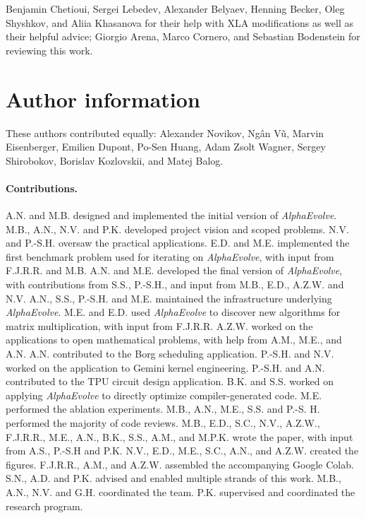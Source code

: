 \documentclass[logo,copyright,12pt]{googledeepmind}
\theoremstyle{definition}
\theoremstyle{remark}
\theoremstyle{plain}
\newcommand{\method}{\emph{AlphaEvolve}\xspace}
\begin{document}
Benjamin Chetioui, Sergei Lebedev, Alexander Belyaev, Henning Becker, Oleg Shyshkov, and Aliia Khasanova for their help with XLA modifications as well as their helpful advice; Giorgio Arena, Marco Cornero, and Sebastian Bodenstein for reviewing this work.


\section*{Author information}
\label{sec:authors}

These authors contributed equally: Alexander Novikov, Ngân Vũ, Marvin Eisenberger, Emilien Dupont, Po-Sen Huang, Adam Zsolt Wagner, Sergey Shirobokov, Borislav Kozlovskii, and Matej Balog.

\paragraph{Contributions.}
A.N. and M.B. designed and implemented the initial version of \method.
\;
M.B., A.N., N.V. and P.K. developed project vision and scoped problems.
\;
N.V. and P.-S.H. oversaw the practical applications.
\;
E.D. and M.E. implemented the first benchmark problem used for iterating on \method, with input from F.J.R.R. and M.B.
\;
A.N. and M.E. developed the final version of \method, with contributions from S.S., P.-S.H., and input from M.B., E.D., A.Z.W. and N.V.
\;
A.N., S.S., P.-S.H. and M.E. maintained the infrastructure underlying \method.
\;
M.E. and E.D. used \method to discover new algorithms for matrix multiplication, with input from F.J.R.R.
\;
A.Z.W. worked on the applications to open mathematical problems, with help from A.M., M.E., and A.N.
\;
A.N. contributed to the Borg scheduling application.
\;
P.-S.H. and N.V. worked on the application to Gemini kernel engineering.
\;
P.-S.H. and A.N. contributed to the TPU circuit design application.
\;
B.K. and S.S. worked on applying \method to directly optimize compiler-generated code.
\;
M.E. performed the ablation experiments.
\;
M.B., A.N., M.E., S.S. and P.-S. H. performed the majority of code reviews.
\;
M.B., E.D., S.C., N.V., A.Z.W., F.J.R.R., M.E., A.N., B.K., S.S., A.M., and M.P.K. wrote the paper, with input from A.S.,  P.-S.H and P.K.
\;
N.V., E.D., M.E., S.C., A.N., and A.Z.W. created the figures.
\;
F.J.R.R., A.M., and A.Z.W. assembled the accompanying Google Colab.
\;
S.N., A.D. and P.K. advised and enabled multiple strands of this work.
\;
M.B., A.N., N.V. and G.H. coordinated the team. 
\;
P.K. supervised and coordinated the research program. 
\end{document}
